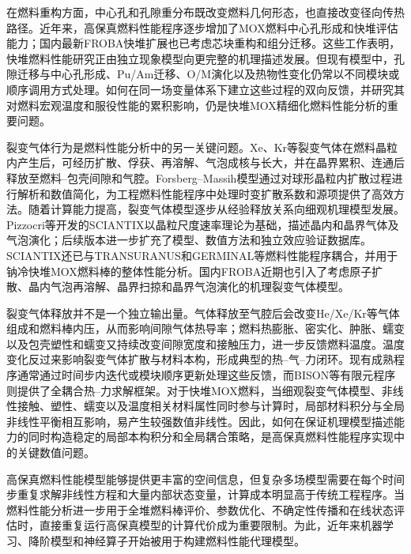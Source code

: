 在燃料重构方面，中心孔和孔隙重分布既改变燃料几何形态，也直接改变径向传热路径。近年来，高保真燃料性能程序逐步增加了MOX燃料中心孔形成和快堆评估能力\cite{williamsonBISONFlexibleCode2021}；国内最新FROBA快堆扩展也已考虑芯块重构和组分迁移\cite{dengUpgradeFROBACode2026}。这些工作表明，快堆燃料性能研究正由独立现象模型向更完整的机理描述发展。但现有模型中，孔隙迁移与中心孔形成、Pu/Am迁移、O/M演化以及热物性变化仍常以不同模块或顺序调用方式处理。如何在同一场变量体系下建立这些过程的双向反馈，并研究其对燃料宏观温度和服役性能的累积影响，仍是快堆MOX精细化燃料性能分析的重要问题。


裂变气体行为是燃料性能分析中的另一关键问题。Xe、Kr等裂变气体在燃料晶粒内产生后，可经历扩散、俘获、再溶解、气泡成核与长大，并在晶界累积、连通后释放至燃料--包壳间隙和气腔。Forsberg--Massih模型通过对球形晶粒内扩散过程进行解析和数值简化，为工程燃料性能程序中处理时变扩散系数和源项提供了高效方法\cite{forsbergDiffusionTheoryFission1985}。随着计算能力提高，裂变气体模型逐步从经验释放关系向细观机理模型发展。Pizzocri等开发的SCIANTIX以晶粒尺度速率理论为基础，描述晶内和晶界气体及气泡演化\cite{pizzocriSCIANTIXNewOpen2020}；后续版本进一步扩充了模型、数值方法和独立效应验证数据库\cite{zulloSCIANTIXCodeFission2023}。SCIANTIX还已与TRANSURANUS和GERMINAL等燃料性能程序耦合，并用于钠冷快堆MOX燃料棒的整体性能分析\cite{magniApplicationSCIANTIXFission2022}。国内FROBA近期也引入了考虑原子扩散、晶内气泡再溶解、晶界扫掠和晶界气泡演化的机理裂变气体模型\cite{kouDevelopmentApplicationMechanism2026}。

裂变气体释放并不是一个独立输出量。气体释放至气腔后会改变He/Xe/Kr等气体组成和燃料棒内压，从而影响间隙气体热导率；燃料热膨胀、密实化、肿胀、蠕变以及包壳塑性和蠕变又持续改变间隙宽度和接触压力，进一步反馈燃料温度。温度变化反过来影响裂变气体扩散与材料本构，形成典型的热--气--力闭环。现有成熟程序通常通过时间步内迭代或模块顺序更新处理这些反馈，而BISON等有限元程序则提供了全耦合热--力求解框架\cite{williamsonBISONFlexibleCode2021}。对于快堆MOX燃料，当细观裂变气体模型、非线性接触、塑性、蠕变以及温度相关材料属性同时参与计算时，局部材料积分与全局非线性平衡相互影响，易产生较强数值非线性。因此，如何在保证机理模型描述能力的同时构造稳定的局部本构积分和全局耦合策略，是高保真燃料性能程序实现中的关键数值问题。


高保真燃料性能模型能够提供更丰富的空间信息，但复杂多场模型需要在每个时间步重复求解非线性方程和大量内部状态变量，计算成本明显高于传统工程程序。当燃料性能分析进一步用于全堆燃料棒评价、参数优化、不确定性传播和在线状态评估时，直接重复运行高保真模型的计算代价成为重要限制。为此，近年来机器学习、降阶模型和神经算子开始被用于构建燃料性能代理模型。

